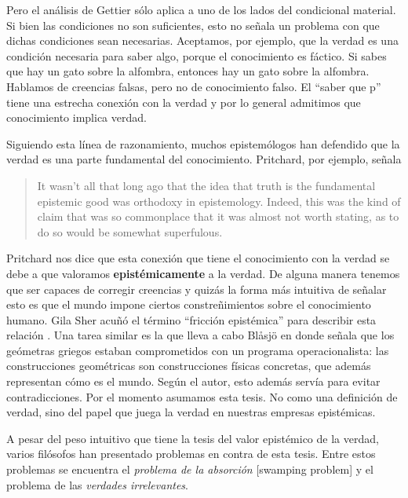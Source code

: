 \documentclass{article}
\begin{document}
Pero el análisis de Gettier sólo aplica a uno de los lados del condicional material. Si bien las condiciones no son suficientes, esto no señala un problema con que dichas condiciones sean necesarias. Aceptamos, por ejemplo, que la verdad es una condición necesaria para saber algo, porque el conocimiento es fáctico. Si sabes que hay un gato sobre la alfombra, entonces hay un gato sobre la alfombra. Hablamos de creencias falsas, pero no de conocimiento falso. El ``saber que p'' tiene una estrecha conexión con la verdad y por lo general admitimos que conocimiento implica verdad.

Siguiendo esta línea de razonamiento, muchos epistemólogos han defendido que la verdad es una parte fundamental del conocimiento. Pritchard, por ejemplo, señala  

\begin{quote}
It wasn’t all that long ago that the idea that truth is the fundamental epistemic good was orthodoxy in epistemology. Indeed, this was the kind of claim that was so commonplace that it was almost not worth stating, as to do so would be somewhat superfulous. \citeyear[p. 1]{Pritchard2021}
\end{quote}

Pritchard nos dice que esta conexión que tiene el conocimiento con la verdad se debe a que valoramos \textbf{epistémicamente} a la verdad. De alguna manera tenemos que ser capaces de corregir creencias y quizás la forma más intuitiva de señalar esto es que el mundo impone ciertos constreñimientos sobre el conocimiento humano. Gila Sher acuñó el término ``fricción epistémica'' para describir esta relación \citeyear{Sher2016}. Una tarea similar es la que lleva a cabo Blåsjö en \citeyear{Blaasjoe2022} donde señala que los geómetras griegos estaban comprometidos con un programa operacionalista: las construcciones geométricas son construcciones físicas concretas, que además representan cómo es el mundo. Según el autor, esto además servía para evitar contradicciones. Por el momento asumamos esta tesis. No como una definición de verdad, sino del papel que juega la verdad en nuestras empresas epistémicas.

A pesar del peso intuitivo que tiene la tesis del valor epistémico de la verdad, varios filósofos han presentado problemas en contra de esta tesis. Entre estos problemas se encuentra el \textit{problema de la absorción} [swamping problem] y el problema de las \textit{verdades irrelevantes}. 
\end{document}
